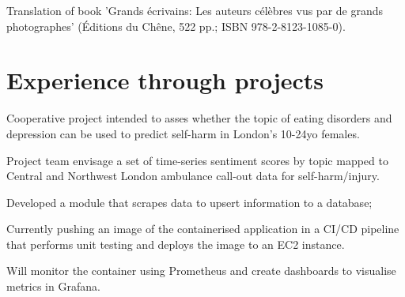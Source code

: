 \documentclass[]{plushcv}
\begin{document}
\begin{minipage}[t]{0.70\textwidth}
Translation of book 'Grands écrivains: Les auteurs célèbres vus par de grands photographes' (Éditions du Chêne, 522 pp.; ISBN 978-2-8123-1085-0).
\sectionsep



\section{Experience through projects}


\begin{tightemize}
\item Cooperative project intended to asses whether the topic of eating disorders and depression can be used to predict self-harm in London's 10-24yo females.
\item Project team envisage a set of time-series sentiment scores by topic mapped to Central and Northwest London ambulance call-out data for self-harm/injury. 
\end{tightemize}
\sectionsep

\begin{tightemize}
\item Developed a module that scrapes data to upsert information to a database;
\item Currently pushing an image of the containerised application in a CI/CD pipeline that performs unit testing and deploys the image to an EC2 instance.
\item Will monitor the container using Prometheus and create dashboards to visualise metrics in Grafana.
\end{tightemize}
\sectionsep



\end{minipage}
\end{document}

